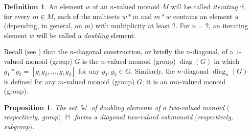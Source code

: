 \documentclass[14pt, dvipsnames]{extarticle}
\theoremstyle{plain}
\newtheorem{prop}{Proposition}
\theoremstyle{definition}
\newtheorem{defi}{Definition}
\theoremstyle{remark}
\DeclareMathOperator{\diag}{\mathrm{diag}}
\DeclareMathOperator{\M}{\mathbb{M}}
\DeclareMathOperator{\W}{\mathbb{W}}
\begin{document}
\begin{defi}\label{iterating_element_definition}
An element $w$ of an $n$-valued monoid $M$ will be called {\it iterating} if, for every $m\in M$, each of the multisets $w\ast m$ and $m\ast w$ contains an element $u$ (depending, in general, on $m$) with multiplicity at least $2$. For $n = 2$, an iterating element $w$ will be called a {\it doubling} element.
\end{defi}

Recall (see \cite[Lemma 1]{Buchstaber}) that the $n$-diagonal construction, or briefly the $n$-diagonal, of a $1$-valued monoid (group) $G$ is the $n$-valued monoid (group) $\diag(G)$ in which $g_1\ast g_2 = [g_1g_2, ..., g_1g_2]$ for any $g_1, g_2 \in G$. Similarly, the $n$-diagonal $\diag_n(G)$ is defined for any $m$-valued monoid (group) $G$; it is an $mn$-valued monoid (group). 

\begin{prop}\label{doubling_monoid}
The set $\W$ of doubling elements of a two-valued monoid $($respectively, group$)$ $\M$ forms a diagonal two-valued submonoid $($respectively, subgroup$)$.
\end{prop}
\end{document}
